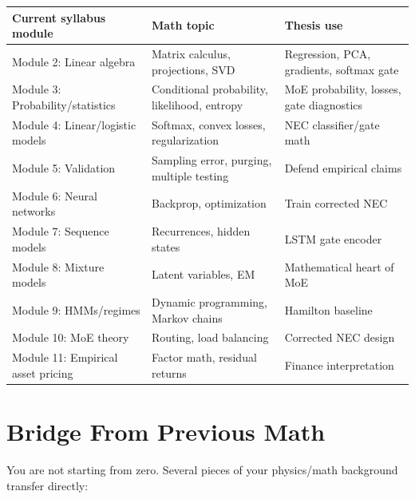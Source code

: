 \documentclass[11pt]{article}
\begin{document}
\begin{longtable}{>{\raggedright\arraybackslash}p{} >{\raggedright\arraybackslash}p{} >{\raggedright\arraybackslash}p{}}
\textbf{Current syllabus module} & \textbf{Math topic} & \textbf{Thesis use} \\
\hline
Module 2: Linear algebra & Matrix calculus, projections, SVD & Regression, PCA, gradients, softmax gate \\
Module 3: Probability/statistics & Conditional probability, likelihood, entropy & MoE probability, losses, gate diagnostics \\
Module 4: Linear/logistic models & Softmax, convex losses, regularization & NEC classifier/gate math \\
Module 5: Validation & Sampling error, purging, multiple testing & Defend empirical claims \\
Module 6: Neural networks & Backprop, optimization & Train corrected NEC \\
Module 7: Sequence models & Recurrences, hidden states & LSTM gate encoder \\
Module 8: Mixture models & Latent variables, EM & Mathematical heart of MoE \\
Module 9: HMMs/regimes & Dynamic programming, Markov chains & Hamilton baseline \\
Module 10: MoE theory & Routing, load balancing & Corrected NEC design \\
Module 11: Empirical asset pricing & Factor math, residual returns & Finance interpretation \\
\end{longtable}

\section{Bridge From Previous Math}

You are not starting from zero. Several pieces of your physics/math background transfer directly:
\end{document}
